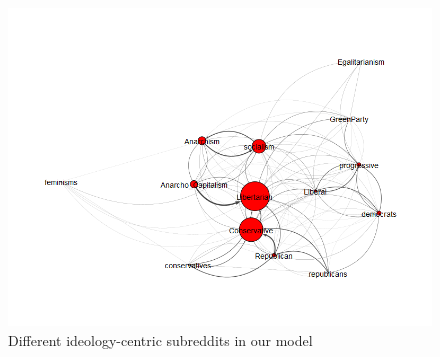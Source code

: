 \documentclass[11pt]{article}
\begin{document}
\begin{figure}[h]
	\includegraphics[width=\textwidth]{img/ideology_network.png}
	\caption{\label{ideology_net_big} Different ideology-centric subreddits in our model}
\end{figure}
\end{document}
